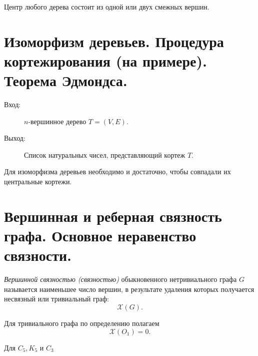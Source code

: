 \begin{theorem}[Жордан]
    Центр любого дерева состоит из одной или двух смежных вершин.
\end{theorem}

\section{Изоморфизм деревьев. Процедура кортежирования (на примере). Теорема Эдмондса.}

\begin{note}\leavevmode
    \begin{description}
        \item[Вход:] $ n $-вершинное дерево $ T = (V,E) $.
        \item[Выход:] Список натуральных чисел, представляющий кортеж $ T $.
    \end{description}
    \begin{figure}[H]
        \centering
        \label{fig:fig_26}
    \end{figure}
\end{note}

\begin{theorem}[Эдмондс]
    Для изоморфизма деревьев необходимо и достаточно, чтобы совпадали их центральные кортежи.
\end{theorem}

\section{Вершинная и реберная связность графа. Основное неравенство связности.}

\begin{definition}
    \emph{Вершинной связностью (связностью)} обыкновенного нетривиального графа $ G $ называется наименьшее число вершин, в результате удаления которых получается несвязный или тривиальный граф:
    \[
        \mathcal{X}(G).
    \]
\end{definition}

\begin{note}
    Для тривиального графа по определению полагаем
    \[
        \mathcal{X}(O_1) = 0.
    \]
\end{note}

\begin{example}
    Для $ C_5,K_5 $ и $ C_3 $
    \begin{figure}[H]
        \centering
        \label{fig:fig_27}
    \end{figure}
\end{example}

